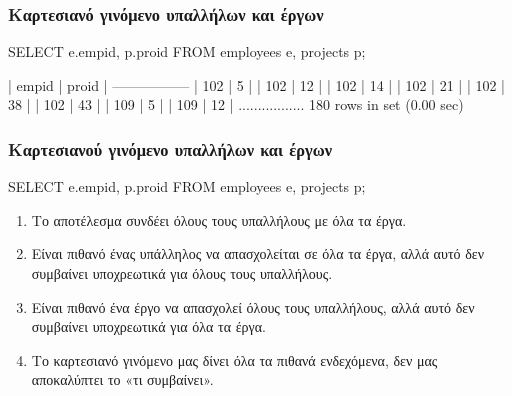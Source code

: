 \begin{frame}
\frametitle{Καρτεσιανό γινόμενο υπαλλήλων και έργων}
\begin{minipage}{\wE}
\en
\begin{SQL}
  SELECT e.empid, p.proid
    FROM employees e, projects p;

| empid | proid |
-----------------
|   102 |     5 |
|   102 |    12 |
|   102 |    14 |
|   102 |    21 |
|   102 |    38 |
|   102 |    43 |
|   109 |     5 |
|   109 |    12 |
.................
180 rows in set (0.00 sec)
\end{SQL}
\el
\end{minipage}
\end{frame}


\begin{frame}
\frametitle{Καρτεσιανού γινόμενο υπαλλήλων και έργων}
\begin{minipage}{\wE}
\en
\begin{SQL}
  SELECT e.empid, p.proid
    FROM employees e, projects p;
\end{SQL}
\el
\pause
\begin{enumerate} %
  \item Το αποτέλεσμα συνδέει {\crr όλους} τους υπαλλήλους με {\crr όλα} τα έργα.
  \item Είναι {\crr πιθανό} ένας υπάλληλος να απασχολείται σε όλα τα έργα,
        αλλά αυτό δεν συμβαίνει {\crr υποχρεωτικά} για όλους τους υπαλλήλους.
  \item Είναι {\crr πιθανό} ένα έργο να απασχολεί όλους τους υπαλλήλους,
        αλλά αυτό δεν συμβαίνει {\crr υποχρεωτικά} για όλα τα έργα.
  \item Το καρτεσιανό γινόμενο μας δίνει όλα τα {\crr πιθανά ενδεχόμενα}, δεν μας
        αποκαλύπτει το «τι συμβαίνει».
\end{enumerate}
\end{minipage}
\end{frame}


